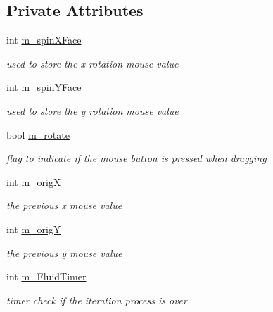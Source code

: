 \subsection*{Private Attributes}
\begin{DoxyCompactItemize}
\item 
int \hyperlink{class_g_l_window_af8ea09020a5ad4c20a16ea835ed1f2af}{m\_\-spinXFace}
\begin{DoxyCompactList}\small\item\em used to store the x rotation mouse value \item\end{DoxyCompactList}\item 
int \hyperlink{class_g_l_window_aa4c39badfa80d8eac6a773449b6db5a2}{m\_\-spinYFace}
\begin{DoxyCompactList}\small\item\em used to store the y rotation mouse value \item\end{DoxyCompactList}\item 
bool \hyperlink{class_g_l_window_a1b5d8b223995bc9740074c5342fe8e38}{m\_\-rotate}
\begin{DoxyCompactList}\small\item\em flag to indicate if the mouse button is pressed when dragging \item\end{DoxyCompactList}\item 
int \hyperlink{class_g_l_window_ab6aec410f5ce5868cabe5fe2f0768bc9}{m\_\-origX}
\begin{DoxyCompactList}\small\item\em the previous x mouse value \item\end{DoxyCompactList}\item 
int \hyperlink{class_g_l_window_ab7a1ee2202588e005b90c99ea1323af4}{m\_\-origY}
\begin{DoxyCompactList}\small\item\em the previous y mouse value \item\end{DoxyCompactList}\item 
int \hyperlink{class_g_l_window_a1a000254ac61defca21846dbd780bbd3}{m\_\-FluidTimer}
\begin{DoxyCompactList}\small\item\em timer check if the iteration process is over \item\end{DoxyCompactList}\item 

\end{DoxyCompactItemize}
